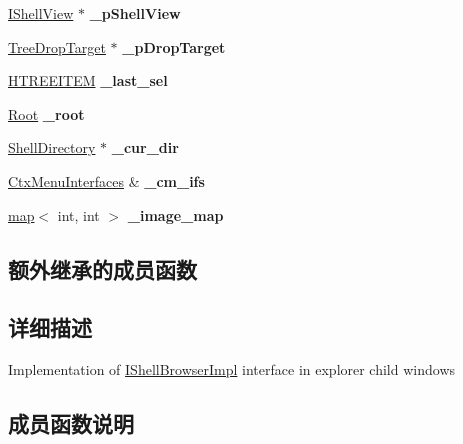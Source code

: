\begin{DoxyCompactItemize}
\item 
\mbox{\label{struct_shell_browser_ac052d34e7dc7f359fc048e3a88dffceb}} 
\hyperlink{interface_i_shell_view}{I\+Shell\+View} $\ast$ {\bfseries \+\_\+p\+Shell\+View}
\item 
\mbox{\label{struct_shell_browser_a03ab179040e2c7db86407607ef731bf8}} 
\hyperlink{class_tree_drop_target}{Tree\+Drop\+Target} $\ast$ {\bfseries \+\_\+p\+Drop\+Target}
\item 
\mbox{\label{struct_shell_browser_a5746718f4fba462bc365d4209922d0b5}} 
\hyperlink{struct___t_r_e_e_i_t_e_m}{H\+T\+R\+E\+E\+I\+T\+EM} {\bfseries \+\_\+last\+\_\+sel}
\item 
\mbox{\label{struct_shell_browser_a0d5a5a628e76efe02896309fc065d20d}} 
\hyperlink{struct_root}{Root} {\bfseries \+\_\+root}
\item 
\mbox{\label{struct_shell_browser_af6552752d354536bf7b73a42c6c03c67}} 
\hyperlink{struct_shell_directory}{Shell\+Directory} $\ast$ {\bfseries \+\_\+cur\+\_\+dir}
\item 
\mbox{\label{struct_shell_browser_a957c4d4b28fe6d30d79062a82db87bd6}} 
\hyperlink{struct_ctx_menu_interfaces}{Ctx\+Menu\+Interfaces} \& {\bfseries \+\_\+cm\+\_\+ifs}
\item 
\mbox{\label{struct_shell_browser_ab9a2b697180d10f23eacaa27584d8e88}} 
\hyperlink{classmap}{map}$<$ int, int $>$ {\bfseries \+\_\+image\+\_\+map}
\end{DoxyCompactItemize}
\subsection*{额外继承的成员函数}


\subsection{详细描述}
Implementation of \hyperlink{struct_i_shell_browser_impl}{I\+Shell\+Browser\+Impl} interface in explorer child windows 

\subsection{成员函数说明}
\mbox{\label{struct_shell_browser_a575ee8758d47796428a80c8ac2a66c49}} 
